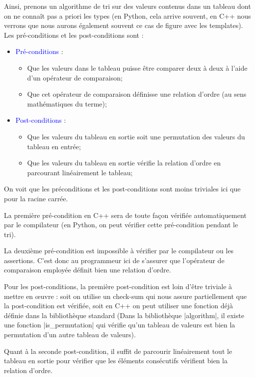 Ainsi, prenons un algorithme de tri sur des valeurs contenus dans un tableau dont on ne connaît pas a priori les types (en Python, cela arrive souvent, en C++ nous verrons que nous aurons également souvent ce cas de figure avec les templates). Les pré-conditions et les post-conditions sont :
\begin{itemize}
  \item \textcolor{blue}{Pré-conditions} : 
  \begin{itemize}
    \item Que les valeurs dans le tableau puisse être comparer deux à deux à l'aide d'un opérateur de comparaison;
    \item Que cet opérateur de comparaison définisse une relation d'ordre (au sens mathématiques du terme);
  \end{itemize}
  \item \textcolor{blue}{Post-conditions} :
  \begin{itemize}
    \item Que les valeurs du tableau en sortie soit une permutation des valeurs du tableau en entrée;
    \item Que les valeurs du tableau en sortie vérifie la relation d'ordre en parcourant linéairement le tableau;
  \end{itemize}
\end{itemize}

On voit que les préconditions et les post-conditions sont moins triviales ici que pour la racine carrée.

La première pré-condition en C++ sera de toute façon vérifiée automatiquement par le compilateur (en Python, on peut vérifier cette pré-condition pendant le tri).

La deuxième pré-condition est impossible à vérifier par le compilateur ou les assertions. C'est donc au programmeur ici de
s'assurer que l'opérateur de comparaison employée définit bien une relation d'ordre.

Pour les post-conditions, la première post-condition est loin d'être triviale à mettre en {\oe}uvre : soit on utilise un check-sum qui nous assure partiellement que la post-condition est vérifiée, soit en C++ on peut utiliser une fonction déjà
définie dans la bibliothèque standard (Dans la bibliothèque |algorithm|, il existe une fonction |is_permutation| qui vérifie
qu'un tableau de valeurs est bien la permutation d'un autre tableau de valeurs).

Quant à la seconde post-condition, il suffit de parcourir linéairement tout le tableau en sortie pour vérifier que les éléments consécutifs vérifient bien la relation d'ordre.

